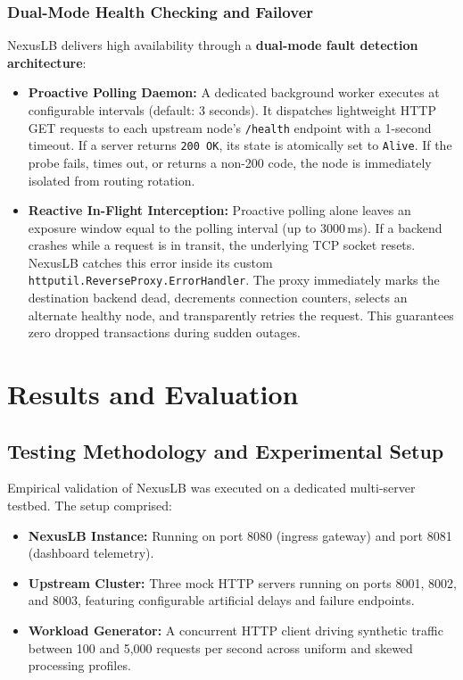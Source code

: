 \documentclass[12pt,openany]{report}
\begin{document}
\subsection{Dual-Mode Health Checking and Failover}

NexusLB delivers high availability through a \textbf{dual-mode fault detection architecture}:

\begin{itemize}
  \item \textbf{Proactive Polling Daemon:} A dedicated background worker executes at configurable intervals (default: 3 seconds). It dispatches lightweight HTTP GET requests to each upstream node's \texttt{/health} endpoint with a 1-second timeout. If a server returns \texttt{200 OK}, its state is atomically set to \texttt{Alive}. If the probe fails, times out, or returns a non-200 code, the node is immediately isolated from routing rotation.
  \item \textbf{Reactive In-Flight Interception:} Proactive polling alone leaves an exposure window equal to the polling interval (up to 3000\,ms). If a backend crashes while a request is in transit, the underlying TCP socket resets. NexusLB catches this error inside its custom \texttt{httputil.ReverseProxy.ErrorHandler}. The proxy immediately marks the destination backend dead, decrements connection counters, selects an alternate healthy node, and transparently retries the request. This guarantees zero dropped transactions during sudden outages.
\end{itemize}


\chapter{Results and Evaluation}

\section{Testing Methodology and Experimental Setup}

Empirical validation of NexusLB was executed on a dedicated multi-server testbed. The setup comprised:
\begin{itemize}
  \item \textbf{NexusLB Instance:} Running on port 8080 (ingress gateway) and port 8081 (dashboard telemetry).
  \item \textbf{Upstream Cluster:} Three mock HTTP servers running on ports 8001, 8002, and 8003, featuring configurable artificial delays and failure endpoints.
  \item \textbf{Workload Generator:} A concurrent HTTP client driving synthetic traffic between 100 and 5,000 requests per second across uniform and skewed processing profiles.
\end{itemize}
\end{document}
